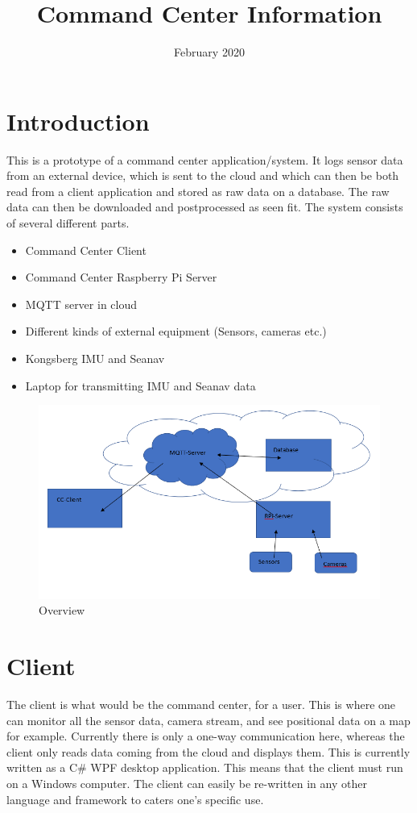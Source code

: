 \documentclass{article}
\title{Command Center Information}
\date{February 2020}
\begin{document}
\maketitle

\section{Introduction}
This is a prototype of a command center application/system. It logs sensor data from an external device, which is sent to the cloud and which can then be both read from a client application and stored as raw data on a database. The raw data can then be downloaded and postprocessed as seen fit.
The system consists of several different parts.
\begin{itemize}
\item Command Center Client
\end{itemize}
\begin{itemize}
\item Command Center Raspberry Pi Server
\item 	MQTT server in cloud
\item 	Different kinds of external equipment (Sensors, cameras etc.)
\item 	Kongsberg IMU and Seanav
\item 	Laptop for transmitting IMU and Seanav data
\end{itemize}



\begin{figure}[h!]
\centering
\includegraphics[scale=0.3]{Img/Image1}
\caption{Overview}
\label{fig:universe}
\end{figure}

\section{Client}
The client is what would be the command center, for a user. This is where one can monitor all the sensor data, camera stream, and see positional data on a map for example.
Currently there is only a one-way communication here, whereas the client only reads data coming from the cloud and displays them.
This is currently written as a C\# WPF desktop application. This means that the client must run on a Windows computer. The client can easily be re-written in any other language and framework to caters one’s specific use.
\end{document}
